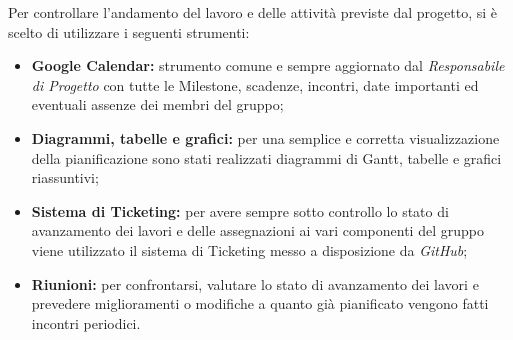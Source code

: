 Per controllare l'andamento del lavoro e delle attività previste dal progetto, si è scelto di utilizzare i seguenti strumenti:
\begin{itemize}
	\item \textbf{\gls{Google Calendar}:} strumento comune e sempre aggiornato dal \textit{Responsabile di Progetto} con tutte le \gls{Milestone}, scadenze, incontri, date importanti ed eventuali assenze dei membri del gruppo;
	\item \textbf{Diagrammi, tabelle e grafici:} per una semplice e corretta visualizzazione della pianificazione sono stati realizzati diagrammi di \gls{Gantt}, tabelle e grafici riassuntivi;
	\item \textbf{Sistema di \gls{Ticketing}:} per avere sempre sotto controllo lo stato di avanzamento dei lavori e delle assegnazioni ai vari componenti del gruppo viene utilizzato il sistema di \gls{Ticketing} messo a disposizione da \textit{\gls{GitHub}};
	\item \textbf{Riunioni:} per confrontarsi, valutare lo stato di avanzamento dei lavori e prevedere miglioramenti o modifiche a quanto già pianificato vengono fatti incontri periodici. 
\end{itemize}

